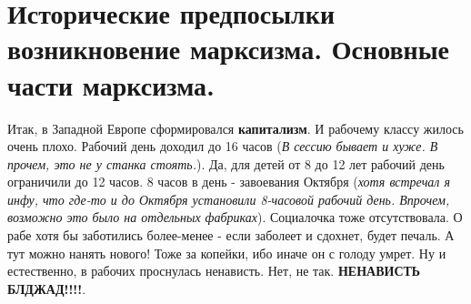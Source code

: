 \section{Исторические предпосылки возникновение марксизма. Основные части марксизма.}
Итак, в Западной Европе сформировался \textbf{капитализм}. И рабочему классу жилось очень плохо. Рабочий день доходил до 16 часов (\textit{В сессию бывает и хуже. В прочем, это не у станка стоять.}). Да, для детей от 8 до 12 лет рабочий день ограничили до 12 часов. 8 часов в день - завоевания Октября (\textit{хотя встречал я инфу, что где-то и до Октября установили 8-часовой рабочий день. Впрочем, возможно это было на отдельных фабриках}). Социалочка тоже отсутствовала. О рабе хотя бы заботились более-менее - если заболеет и сдохнет, будет печаль. А тут можно нанять нового! Тоже за копейки, ибо иначе он с голоду умрет. Ну и естественно, в рабочих проснулась ненависть. Нет, не так. \textbf{НЕНАВИСТЬ БЛДЖАД!!!!}.
